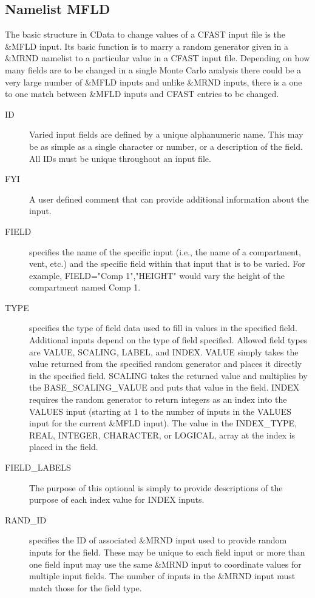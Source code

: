\documentclass[12pt,twoside]{book}
\begin{document}
\subsection{Namelist MFLD}
\label{info:MFLD}

The basic structure in CData to change values of a CFAST input file is the { \ct \&MFLD} input. Its basic function is to marry a random generator given in a { \ct \&MRND} namelist to a particular value in a CFAST input file. Depending on how many fields are to be changed in a single Monte Carlo analysis there could be a very large number of { \ct \&MFLD} inputs and unlike { \ct \&MRND } inputs, there is a one to one match between { \ct \&MFLD} inputs and CFAST entries to be changed.

\begin{description}
  \item[ID] Varied input fields are defined by a unique alphanumeric name. This may be as simple as a single character or number, or a description of the field. All IDs must be unique throughout an input file.
  \item[FYI] A user defined comment that can provide additional information about the input.
  \item[FIELD] specifies the name of the specific input (i.e., the name of a compartment, vent, etc.) and the specific field within that input that is to be varied. For example, {\ct FIELD="Comp 1","HEIGHT"} would vary the height of the compartment named {\ct Comp 1}.
  \item[TYPE] specifies the type of field data used to fill in values in the specified field. Additional inputs depend on the type of field specified. Allowed field types are {\ct VALUE}, {\ct SCALING}, {\ct LABEL}, and {\ct INDEX}. {\ct VALUE} simply takes the value returned from the specified random generator and places it directly in the specified field. {\ct SCALING} takes the returned value and multiplies by the {\ct BASE\_SCALING\_VALUE} and puts that value in the field. {\ct INDEX} requires the random generator to return integers as an index into the {\ct VALUES} input (starting at 1 to the number of inputs in the {\ct VALUES}       input for the current {\ct \&MFLD} input). The value in the {\ct INDEX\_TYPE}, {\ct REAL}, {\ct INTEGER}, {\ct CHARACTER}, or {\ct LOGICAL}, array at the index is placed in the field.
  \item[FIELD\_LABELS] The purpose of this optional is simply to provide descriptions of the purpose of each index value for {\ct INDEX} inputs.
  \item[RAND\_ID] specifies the ID of associated {\ct \&MRND} input used to provide random inputs for the field. These may be unique to each field input or more than one field input may use the same {\ct \&MRND} input to coordinate values for multiple input fields. The number of inputs in the {\ct \&MRND} input must match those for the field type.

\end{description}
\end{document}
